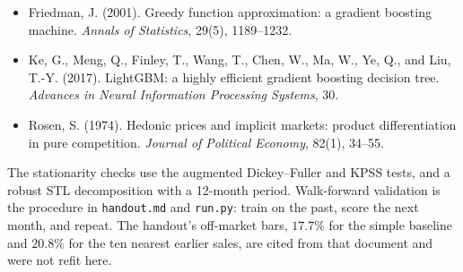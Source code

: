 \documentclass[11pt]{article}
\begin{document}
\begin{itemize}
\item Friedman, J. (2001). Greedy function approximation: a gradient boosting machine. \emph{Annals of Statistics}, 29(5), 1189--1232.
\item Ke, G., Meng, Q., Finley, T., Wang, T., Chen, W., Ma, W., Ye, Q., and Liu, T.-Y. (2017).
LightGBM: a highly efficient gradient boosting decision tree.
\emph{Advances in Neural Information Processing Systems}, 30.
\item Rosen, S. (1974). Hedonic prices and implicit markets: product differentiation in pure competition. \emph{Journal of Political Economy}, 82(1), 34--55.
\end{itemize}

The stationarity checks use the augmented Dickey--Fuller and KPSS tests, and a robust STL decomposition with a 12-month period. Walk-forward validation is the procedure in \texttt{handout.md} and \texttt{run.py}: train on the past, score the next month, and repeat. The handout's off-market bars, \(17.7\%\) for the simple baseline and \(20.8\%\) for the ten nearest earlier sales, are cited from that document and were not refit here.
\end{document}
